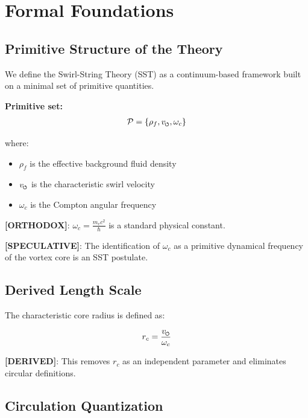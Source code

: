 \section{Formal Foundations}
    \label{sec:foundations}
    
    \subsection{Primitive Structure of the Theory}
        
        We define the Swirl-String Theory (SST) as a continuum-based framework built on a minimal set of primitive quantities.
        
        \textbf{Primitive set:}
        \begin{align}
            \mathcal{P} = \{ \rho_f, v_{\swirlarrow}, \omega_c \}
        \end{align}
        
        where:
        \begin{itemize}
            \item $\rho_f$ is the effective background fluid density
            \item $v_{\swirlarrow}$ is the characteristic swirl velocity
            \item $\omega_c$ is the Compton angular frequency
        \end{itemize}
        
        \textbf{[ORTHODOX]}: $\omega_c = \frac{m_e c^2}{\hbar}$ is a standard physical constant.
        
        \textbf{[SPECULATIVE]}: The identification of $\omega_c$ as a primitive dynamical frequency of the vortex core is an SST postulate.
    
    \subsection{Derived Length Scale}
        
        The characteristic core radius is defined as:
        
        \begin{align}
            r_c = \frac{v_{\swirlarrow}}{\omega_c}
            \label{eq:rc_definition}
        \end{align}
        
        \textbf{[DERIVED]}: This removes $r_c$ as an independent parameter and eliminates circular definitions.
    
    \subsection{Circulation Quantization}
        
